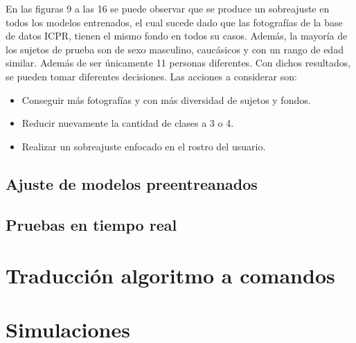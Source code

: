En las figuras 9 a las 16 se puede observar que se produce un sobreajuste en todos los modelos entrenados, el cual sucede dado que las fotografías de la base de datos ICPR, tienen el mismo fondo en todos su casos. Además, la mayoría de los sujetos de prueba son de sexo masculino, caucásicos y con un rango de edad similar. Además de ser únicamente 11 personas diferentes. Con dichos resultados, se pueden tomar diferentes decisiones. Las acciones a considerar son: 

\begin{itemize}
	\item Conseguir más fotografías y con más diversidad de sujetos y fondos.
	\item Reducir nuevamente la cantidad de clases a 3 o 4. 
	\item Realizar un sobreajuste enfocado en el rostro del usuario.
\end{itemize}


\section{Ajuste de modelos preentreanados}
\section{Pruebas en tiempo real}

\chapter{Traducción algoritmo a comandos}


\chapter{Simulaciones}



